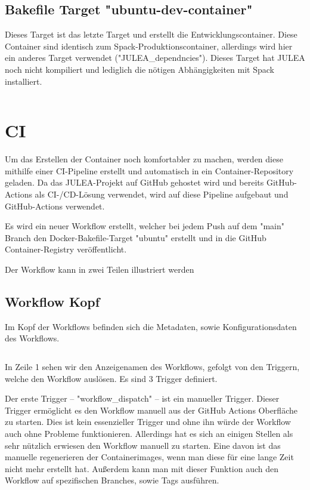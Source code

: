 \inputminted[firstline=52,lastline=62]{./lexers/docker-bake-lexer.py}{./code-examples/docker-bake.hcl}

\subsection{Bakefile Target "ubuntu-dev-container"}

Dieses Target ist das letzte Target und erstellt die Entwicklungscontainer. Diese Container sind identisch zum Spack-Produktionscontainer, allerdings wird hier ein anderes Target verwendet ("JULEA\_dependncies"). Dieses Target hat JULEA noch nicht kompiliert und lediglich die nötigen Abhängigkeiten mit Spack installiert.

\inputminted[firstline=64]{./lexers/docker-bake-lexer.py}{./code-examples/docker-bake.hcl}

\section{CI}

Um das Erstellen der Container noch komfortabler zu machen, werden diese mithilfe einer CI-Pipeline erstellt und automatisch in ein Container-Repository geladen. Da das JULEA-Projekt auf GitHub gehostet wird und bereits GitHub-Actions als CI-/CD-Lösung verwendet, wird auf diese Pipeline aufgebaut und GitHub-Actions verwendet.

Es wird ein neuer Workflow erstellt, welcher bei jedem Push auf dem "main" Branch den Docker-Bakefile-Target "ubuntu" erstellt und in die GitHub Container-Registry veröffentlicht.

Der Workflow kann in zwei Teilen illustriert werden 

\subsection{Workflow Kopf}

Im Kopf der Workflows befinden sich die Metadaten, sowie Konfigurationsdaten des Workflows.

\inputminted[firstline=0,lastline=10]{yaml}{./code-examples/containers-ci.yml}

In Zeile 1 sehen wir den Anzeigenamen des Workflows, gefolgt von den Triggern, welche den Workflow auslösen. Es sind 3 Trigger definiert. 

Der erste Trigger – "workflow\_dispatch" – ist ein manueller Trigger. Dieser Trigger ermöglicht es den Workflow manuell aus der GitHub Actions Oberfläche zu starten. Dies ist kein essenzieller Trigger und ohne ihn würde der Workflow auch ohne Probleme funktionieren. Allerdings hat es sich an einigen Stellen als sehr nützlich erwiesen den Workflow manuell zu starten. Eine davon ist das manuelle regenerieren der Containerimages, wenn man diese für eine lange Zeit nicht mehr erstellt hat. Außerdem kann man mit dieser Funktion auch den Workflow auf spezifischen Branches, sowie Tags ausführen.

